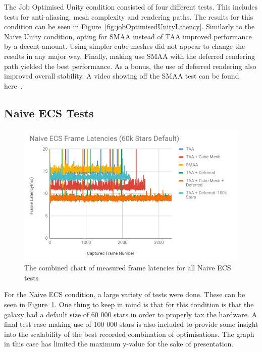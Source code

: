 The Job Optimised Unity condition consisted of four different tests. This includes tests for anti-aliasing, mesh complexity and rendering paths. The results for this condition can be seen in Figure~\ref{fig:jobOptimisedUnityLatency}. Similarly to the Naive Unity condition, opting for SMAA instead of TAA improved performance by a decent amount. Using simpler cube meshes did not appear to change the results in any major way. Finally, making use SMAA with the deferred rendering path yielded the best performance. As a bonus, the use of deferred rendering also improved overall stability. A video showing off the SMAA test can be found here~\cite{jobOptimisedUnityVideo}. 

\subsection{Naive ECS Tests}
\begin{figure}[!p]
    \centering
    \includegraphics[width=1\textwidth]{Figures/naiveEcsLatencies.png}
    \caption[Combined Frame Latency Chart for Unity Tests]{The combined chart of measured frame latencies for all Naive ECS tests}
    \label{fig:naiveEcsUnityLatency}
\end{figure}

For the Naive ECS condition, a large variety of tests were done. These can be seen in Figure~\ref{fig:naiveEcsUnityLatency}. One thing to keep in mind is that for this condition is that the galaxy had a default size of 60 000 stars in order to properly tax the hardware. A final test case making use of 100 000 stars is also included to provide some insight into the scalability of the best recorded combination of optimisations. 
The graph in this case has limited the maximum y-value for the sake of presentation. 

